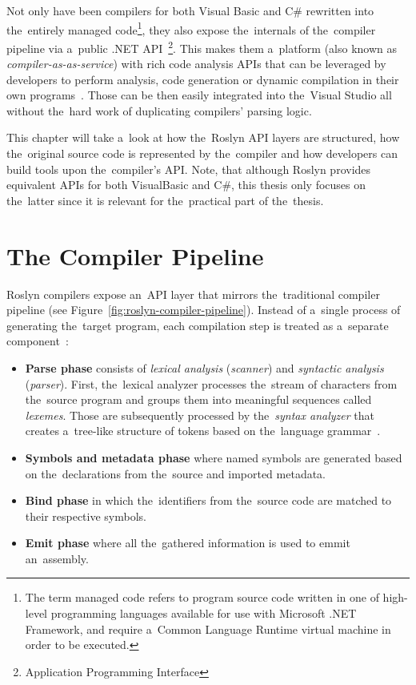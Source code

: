 \documentclass[
  digital, %
  table,   %
  lof,     %
  lot,     %
  oneside,
]{fithesis3}
\begin{document}
Not only have been compilers for both Visual Basic and C\# rewritten into the~entirely managed code\footnote{The term managed code refers to program source code written in one of high-level programming languages available for use with Microsoft .NET Framework, and require a~Common Language Runtime virtual machine in order to be executed.}, they also expose the~internals of the~compiler pipeline via a~public .NET API~\footnote{Application Programming Interface}. This makes them a~platform (also known as \textit{compiler-as-as-service}) with rich code analysis APIs that can be leveraged by developers to perform analysis, code generation or dynamic compilation in their own programs~\cite{roslyn-succinctly}. Those can be then easily integrated into the~Visual Studio all without the~hard work of duplicating compilers' parsing logic.

This chapter will take a~look at how the~Roslyn API layers are structured, how the~original source code is represented by the~compiler and how developers can build tools upon the~compiler's API. Note, that although Roslyn provides equivalent APIs for both VisualBasic and C\#, this thesis only focuses on the~latter since it is relevant for the~practical part of the~thesis.  
  
\section{The Compiler Pipeline}
Roslyn compilers expose an~API layer that mirrors the~traditional compiler pipeline (see Figure~\ref{fig:roslyn-compiler-pipeline}). Instead of a~single process of generating the~target program, each compilation step is treated as a~separate component~\cite{roslyn-overview}:

\begin{itemize}
  \item \textbf{Parse phase} consists of \textit{lexical analysis} (\textit{scanner}) and \textit{syntactic analysis} (\textit{parser}). First, the~lexical analyzer processes the~stream of characters from the~source program and groups them into meaningful sequences called \textit{lexemes}. Those are subsequently processed by the~\textit{syntax analyzer} that creates a~tree-like structure of tokens based on the~language grammar~\cite{dragon-book}.

  \item \textbf{Symbols and metadata phase} where named symbols are generated based on the~declarations from the~source and imported metadata.

  \item \textbf{Bind phase} in which the~identifiers from the~source code are matched to their respective symbols.

  \item \textbf{Emit phase} where all the~gathered information is used to emmit an~assembly.
\end{itemize}
\end{document}
